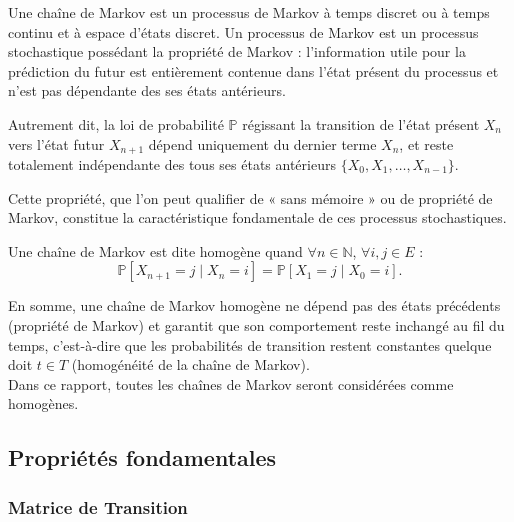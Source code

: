 \documentclass{article}
\begin{document}
Une chaîne de Markov est un processus de Markov à temps discret ou à temps continu et à espace d'états discret. Un processus de Markov est un processus stochastique possédant la propriété de Markov : l'information utile pour la prédiction du futur est entièrement contenue dans l'état présent du processus et n'est pas dépendante des ses états antérieurs.

Autrement dit, la loi de probabilité $\mathbb{P}$ régissant la transition de l'état présent $X_n$ vers l'état futur $X_{n+1}$ dépend uniquement du dernier terme $X_n$, et reste totalement indépendante des tous ses états antérieurs $\{X_0, X_1, \dots, X_{n-1}\}$.

Cette propriété, que l'on peut qualifier de « sans mémoire » ou de propriété de Markov, constitue la caractéristique fondamentale de ces processus stochastiques. \\

\begin{tcolorbox}[colback=white,colframe=blue!80!black,title=Chaine de Markov Homogène]
Une chaîne de Markov est dite homogène quand $\forall n \in \mathbb{N}$, $\forall i,j \in E$ :
\[
  \mathbb{P}[X_{n+1} = j \mid X_n = i] = \mathbb{P}[X_1 = j \mid X_0 = i].
\]
\end{tcolorbox}

En somme, une chaîne de Markov homogène ne dépend pas des états précédents (propriété de Markov) et garantit que son comportement reste inchangé au fil du temps, c'est-à-dire que les probabilités de transition restent constantes quelque doit $t \in T$ (homogénéité de la chaîne de Markov). \\
Dans ce rapport, toutes les chaînes de Markov seront considérées comme homogènes. \\

\newpage %
\subsection{Propriétés fondamentales}


\subsubsection{Matrice de Transition}
\end{document}
